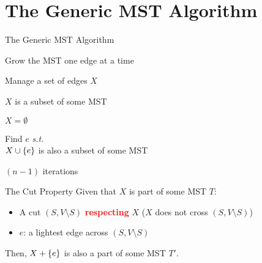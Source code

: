 \section{The Generic MST Algorithm}	\label{section:mst-generic-alg}

\begin{frame}{The Generic MST Algorithm}
  \begin{description}
	\setlength{\itemsep}{5pt}
	\item<1->[Overview:] Grow the MST one edge at a time
	\item<2->[State:] Manage a set of edges $X$
	\item<3->[\textcolor{red}{\bf Invariant:}] $X$ is a subset of some MST
	\item<4->[Init:] $X = \emptyset$
	\item<5->[Iteration:] Find  $e$ {\it s.t.} 
	  \\ $X \cup \{e\}$ is also a subset of some MST
	\item<7->[Termination:] $(n-1)$ iterations
  \end{description}

  \vspace{0.20cm}
\end{frame}
\begin{frame}{The Cut Property}
	Given that $X$ is part of some MST $T$:
	\vspace{0.10cm}
    \begin{itemize}
	  \setlength{\itemsep}{3pt}
      \item<2-> A cut $(S, V \setminus S)$ \textcolor{red}{\bf respecting} $X$ ($X$ does not cross $(S, V \setminus S)$)
	  \item<6-> $e$: a lightest edge across $(S, V \setminus S)$
	\end{itemize}
	\vspace{0.10cm}
	Then, $X + \{e\}$ is also a part of some MST $T'$.

\end{frame}
